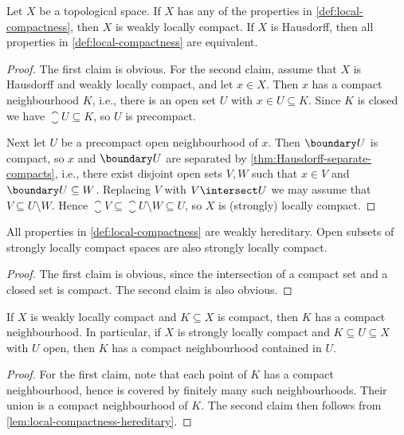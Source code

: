 \documentclass[article, a4paper, 11pt, oneside]{memoir}
\numberwithin{equation}{chapter}
\begin{document}
\begin{proposition}
    \label{thm:LCH-equivalent-condition}
    Let $X$ be a topological space. If $X$ has any of the properties in \cref{def:local-compactness}, then $X$ is weakly locally compact. If $X$ is Hausdorff, then all properties in \cref{def:local-compactness} are equivalent.
\end{proposition}

\begin{proof}
    The first claim is obvious. For the second claim, assume that $X$ is Hausdorff and weakly locally compact, and let $x \in X$. Then $x$ has a compact neighbourhood $K$, i.e., there is an open set $U$ with $x \in U \subseteq K$. Since $K$ is closed we have $\closure{U} \subseteq K$, so $U$ is precompact.

    Next let $U$ be a precompact open neighbourhood of $x$. Then $\boundary U$ is compact, so $x$ and $\boundary U$ are separated by \cref{thm:Hausdorff-separate-compacts}, i.e., there exist disjoint open sets $V,W$ such that $x \in V$ and $\boundary U \subseteq W$. Replacing $V$ with $V \intersect U$ we may assume that $V \subseteq U \setminus W$. Hence $\closure{V} \subseteq \closure{U} \setminus W \subseteq U$, so $X$ is (strongly) locally compact.
\end{proof}


\begin{lemma}
    \label{lem:local-compactness-hereditary}
    All properties in \cref{def:local-compactness} are weakly hereditary. Open subsets of strongly locally compact spaces are also strongly locally compact.
\end{lemma}

\begin{proof}
    The first claim is obvious, since the intersection of a compact set and a closed set is compact. The second claim is also obvious.
\end{proof}


\begin{lemma}
    \label{thm:LCH-compact-set-has-compact-nhood}
    If $X$ is weakly locally compact and $K \subseteq X$ is compact, then $K$ has a compact neighbourhood. In particular, if $X$ is strongly locally compact and $K \subseteq U \subseteq X$ with $U$ open, then $K$ has a compact neighbourhood contained in $U$.
\end{lemma}

\begin{proof}
    For the first claim, note that each point of $K$ has a compact neighbourhood, hence is covered by finitely many such neighbourhoods. Their union is a compact neighbourhood of $K$. The second claim then follows from \cref{lem:local-compactness-hereditary}.
\end{proof}
\end{document}
